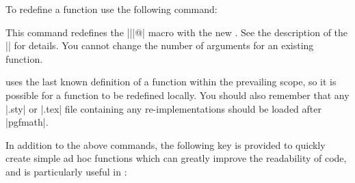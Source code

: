 To redefine a function use the following command:

\begin{command}{\pgfmathredeclarefunction{}}
  This command redefines the |\pgfmath||@| macro
  with the new . See the description of the
  |\pgfmathdeclarefunction| for details. You cannot change the number
  of arguments for an existing function.
\begin{codeexample}[]
\makeatletter
{}
\pgfmathresult
{}
\pgfmathresult
\makeatother
\end{codeexample}
\end{command}

  \pgfname{} uses the last known definition of a function within the
  prevailing scope, so it is possible for a function to be redefined
  locally. You should also remember that any |.sty| or |.tex| file
  containing any re-implementations should be loaded after |pgfmath|.

  In addition to the above commands, the following key is provided to
  quickly create simple ad hoc functions which can greatly improve
  the readability of code, and is particularly useful in \tikzname{}:

